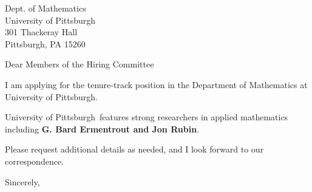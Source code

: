 




	
	
	\def\School{University of Pittsburgh}
	
	\begin{letter}
		{Dept. of Mathematics\\
			University of Pittsburgh\\
			301 Thackeray Hall\\
			Pittsburgh, PA 15260
		}
		
		\opening{Dear Members of the Hiring Committee}
		
		
		I am applying for the tenure-track position in the Department of Mathematics at \School. 
		
		
		
		\School~features strong researchers in applied mathematics including \textbf{G. Bard Ermentrout and Jon Rubin}. 
		
		
		
		
		
		Please request additional details as needed, and I look forward to our correspondence.
		
		\closing{Sincerely,}
	\end{letter}
